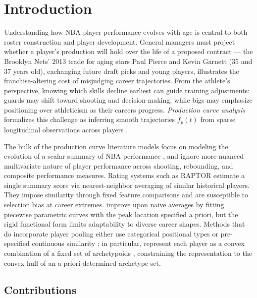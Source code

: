 \documentclass[aoas]{imsart}
\begin{document}
\section{Introduction}

Understanding how NBA player performance evolves with age is central to both roster construction and player development.  General managers must project whether a player’s production will hold over the life of a proposed contract --- the Brooklyn Nets’ 2013 trade for aging stars Paul Pierce and Kevin Garnett (35 and 37 years old), exchanging future draft picks and young players, illustrates the franchise-altering cost of misjudging career trajectories.  From the athlete’s perspective, knowing which skills decline earliest can guide training adjustments: guards may shift toward shooting and decision-making, while bigs may emphasize positioning over athleticism as their careers progress.  \textit{Production curve analysis} formalizes this challenge as inferring smooth trajectories $f_p(t)$ from sparse longitudinal observations across players \citep{wakim2014functional}. 



The bulk of the production curve literature models focus on modeling the evolution of a scalar summary of NBA performance \citep{page2007using, vaci2019large, wakim2014functional}, and ignore more nuanced multivariate nature of player performance across  shooting, rebounding, and composite performance measures.  Rating systems such as RAPTOR \citep[Robust Algorithm using Player Tracking and On/Off Ratings;][]{natesilver538_2015, natesilver538_2019} estimate a single summary score via nearest-neighbor averaging of similar historical players. They impose similarity through fixed feature comparisons and are susceptible to selection bias at career extremes.  \citet{vaci2019large} improve upon naive averages by fitting piecewise parametric curves with the peak location specified a priori, but the rigid functional form limits adaptability to diverse career shapes.  Methods that do incorporate player pooling either use categorical positional types \citep{page2007using} or pre-specified continuous similarity \citep{wakim2014functional, vinue2019forecasting}; in particular, \citet{vinue2019forecasting} represent each player as a convex combination of a fixed set of archetypoids \citep{vinue2015archetypoids}, constraining the representation to the convex hull of an a-priori determined archetype set.  



\subsection{Contributions}
\label{sec:contributions}
\end{document}

